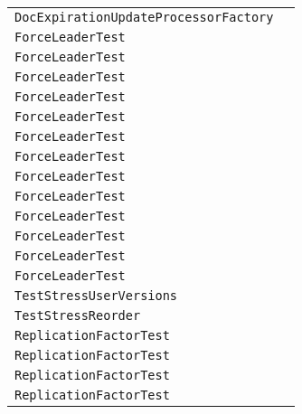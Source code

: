 \begin{center}
\begin{tabular}{ll}
\lstinline/DocExpirationUpdateProcessorFactory/&\raisebox{0pt}{\lstinline/amInChargeOfPeriodicDeletes()/}\\
\lstinline/ForceLeaderTest/&\raisebox{0pt}{\lstinline/bringBackOldLeaderAndSendDoc(String,int)/}\\
\lstinline/ForceLeaderTest/&\raisebox{0pt}{\lstinline/bringBackOldLeaderAndSendDoc(String,int)/}\\
\lstinline/ForceLeaderTest/&\raisebox{0pt}{\lstinline/bringBackOldLeaderAndSendDoc(String,int)/}\\
\lstinline/ForceLeaderTest/&\raisebox{0pt}{\lstinline/bringBackOldLeaderAndSendDoc(String,int)/}\\
\lstinline/ForceLeaderTest/&\raisebox{0pt}{\lstinline/bringBackOldLeaderAndSendDoc(String,int)/}\\
\lstinline/ForceLeaderTest/&\raisebox{0pt}{\lstinline/bringBackOldLeaderAndSendDoc(String,int)/}\\
\lstinline/ForceLeaderTest/&\raisebox{0pt}{\lstinline/bringBackOldLeaderAndSendDoc(String,int)/}\\
\lstinline/ForceLeaderTest/&\raisebox{0pt}{\lstinline/bringBackOldLeaderAndSendDoc(String,int)/}\\
\lstinline/ForceLeaderTest/&\raisebox{0pt}{\lstinline/bringBackOldLeaderAndSendDoc(String,int)/}\\
\lstinline/ForceLeaderTest/&\raisebox{0pt}{\lstinline/bringBackOldLeaderAndSendDoc(String,int)/}\\
\lstinline/ForceLeaderTest/&\raisebox{0pt}{\lstinline/bringBackOldLeaderAndSendDoc(String,int)/}\\
\lstinline/ForceLeaderTest/&\raisebox{0pt}{\lstinline/bringBackOldLeaderAndSendDoc(String,int)/}\\
\lstinline/ForceLeaderTest/&\raisebox{0pt}{\lstinline/bringBackOldLeaderAndSendDoc(String,int)/}\\
\lstinline/TestStressUserVersions/&\raisebox{0pt}{\lstinline/run()/}\\
\lstinline/TestStressReorder/&\raisebox{0pt}{\lstinline/run()/}\\
\lstinline/ReplicationFactorTest/&\raisebox{0pt}{\lstinline/()/}\\
\lstinline/ReplicationFactorTest/&\raisebox{0pt}{\lstinline/()/}\\
\lstinline/ReplicationFactorTest/&\raisebox{0pt}{\lstinline/()/}\\
\lstinline/ReplicationFactorTest/&\raisebox{0pt}{\lstinline/()/}\\

\end{tabular}
\end{center}

